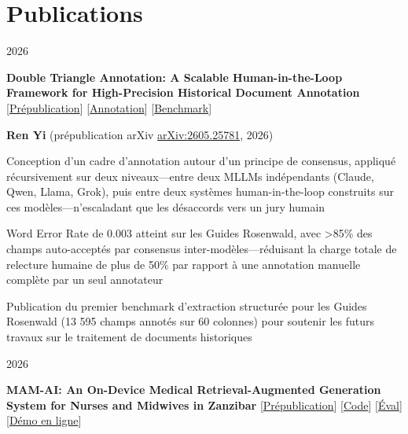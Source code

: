 \section{Publications}

        \begin{twocolentry}[1.5 cm] {2026}

\textbf{Double Triangle Annotation: A Scalable Human-in-the-Loop Framework for High-Precision Historical Document Annotation} [\href{https://arxiv.org/abs/2605.25781}{Prépublication}] [\href{https://github.com/nmrenyi/double-triangle-annotation}{Annotation}] [\href{https://github.com/nmrenyi/rosenwald-benchmark}{Benchmark}]

\end{twocolentry}

        \vspace{0.10 cm}
        \begin{onecolentry}
            \textbf{Ren Yi} (prépublication arXiv \href{https://arxiv.org/abs/2605.25781}{arXiv:2605.25781}, 2026)
        \end{onecolentry}
        \vspace{0.10 cm}

        \begin{onecolentry}
        \begin{highlights}
            \item Conception d'un cadre d'annotation autour d'un principe de consensus, appliqué récursivement sur deux niveaux---entre deux MLLMs indépendants (Claude, Qwen, Llama, Grok), puis entre deux systèmes human-in-the-loop construits sur ces modèles---n'escaladant que les désaccords vers un jury humain
            \item Word Error Rate de 0.003 atteint sur les Guides Rosenwald, avec >85\% des champs auto-acceptés par consensus inter-modèles---réduisant la charge totale de relecture humaine de plus de 50\% par rapport à une annotation manuelle complète par un seul annotateur
            \item Publication du premier benchmark d'extraction structurée pour les Guides Rosenwald (13 595 champs annotés sur 60 colonnes) pour soutenir les futurs travaux sur le traitement de documents historiques
        \end{highlights}
        \end{onecolentry}

        \vspace{0.2 cm}
        \begin{twocolentry}[1.5 cm] {2026}

\textbf{MAM-AI: An On-Device Medical Retrieval-Augmented Generation System for Nurses and Midwives in Zanzibar} [\href{https://arxiv.org/abs/2606.29580}{Prépublication}] [\href{https://github.com/nmrenyi/mamai}{Code}] [\href{https://github.com/nmrenyi/mamai-eval}{Éval}] [\href{https://nmrenyi-mamai-demo.hf.space}{Démo en ligne}]

\end{twocolentry}


